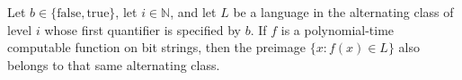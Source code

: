 \begin{theorem}
\label{Complexity.PolyHierarchy.preimage_mem_altClass}
\leanok
{}
Let $b\in\{\mathrm{false},\mathrm{true}\}$, let $i\in\mathbb N$, and let $L$ be a
language in the alternating class of level $i$ whose first quantifier is specified by
$b$. If $f$ is a polynomial-time computable function on bit strings, then the preimage
$\{x:f(x)\in L\}$ also belongs to that same alternating class.
\end{theorem}
